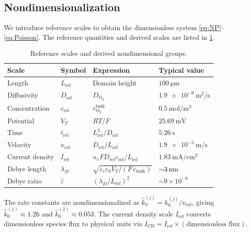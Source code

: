 \documentclass[11pt,a4paper]{article}
\begin{document}
\subsection{Nondimensionalization}\label{sec:nondim}

We introduce reference scales to obtain the dimensionless system
\eqref{eq:NP}--\eqref{eq:Poisson}. The reference quantities and derived
scales are listed in \cref{tab:scales}.

\begin{table}[H]
\centering
\caption{Reference scales and derived nondimensional groups.}
\label{tab:scales}
\begin{tabular}{llll}
\toprule
Scale & Symbol & Expression & Typical value \\
\midrule
Length & $L_{\mathrm{ref}}$ & Domain height & $\SI{100}{\micro\metre}$ \\
Diffusivity & $D_{\mathrm{ref}}$ & $D_{\mathrm{O_2}}$ & $\SI{1.9e-9}{\metre\squared\per\second}$ \\
Concentration & $c_{\mathrm{ref}}$ & $c^{\mathrm{bulk}}_{\mathrm{O_2}}$ & $\SI{0.5}{\mol\per\metre\cubed}$ \\
Potential & $V_T$ & $RT/F$ & $\SI{25.69}{\milli\volt}$ \\
\midrule
Time & $t_{\mathrm{ref}}$ & $L_{\mathrm{ref}}^2 / D_{\mathrm{ref}}$ & $\SI{5.26}{\second}$ \\
Velocity & $\kappa_{\mathrm{ref}}$ & $D_{\mathrm{ref}} / L_{\mathrm{ref}}$ & $\SI{1.9e-5}{\metre\per\second}$ \\
Current density & $I_{\mathrm{ref}}$ & $n_e F D_{\mathrm{ref}} c_{\mathrm{ref}} / L_{\mathrm{ref}}$ & $\SI{1.83}{\milli\ampere\per\centi\metre\squared}$ \\
Debye length & $\lambda_D$ & $\sqrt{\varepsilon_r \varepsilon_0 V_T / (F\, c_{\mathrm{bulk}})}$ & $\SI{\sim 3}{\nano\metre}$ \\
Debye ratio & $\hat{\varepsilon}$ & $(\lambda_D / L_{\mathrm{ref}})^2$ & $\sim 9\times 10^{-8}$ \\
\bottomrule
\end{tabular}
\end{table}

The rate constants are nondimensionalized as
$\hat{k}_0^{(j)} = k_0^{(j)} / \kappa_{\mathrm{ref}}$, giving
$\hat{k}_0^{(1)} \approx 1.26$ and $\hat{k}_0^{(2)} \approx 0.053$.
The current density scale $I_{\mathrm{ref}}$ converts dimensionless
species flux to physical units via
$I_{\mathrm{CD}} = I_{\mathrm{ref}} \times (\text{dimensionless flux})$.
\end{document}
